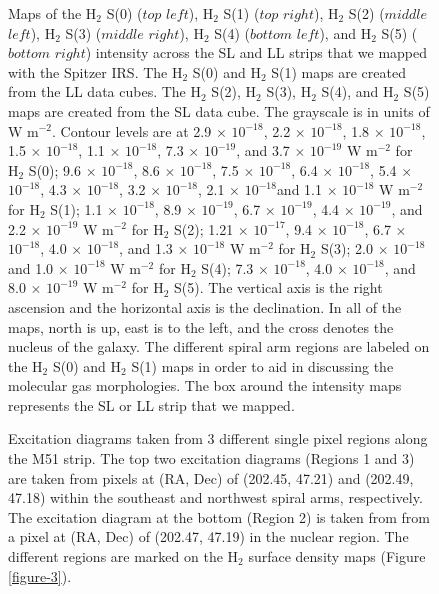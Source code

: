\documentclass[manuscript]{aastex}
\begin{document}
 \begin{figure}
 \caption{Maps of the $\mathrm{H_2}$ S(0) ($top$ $left$), $\mathrm{H_2}$ S(1)
 ($top$ $right$), $\mathrm{H_2}$ S(2) ($middle$ $left$), $\mathrm{H_2}$ S(3) 
 ($middle$ $right$), $\mathrm{H_2}$ S(4) ($bottom$ $left$), and $\mathrm{H_2}$ 
 S(5) ($bottom$ $right$) intensity across the SL and LL strips that we mapped 
 with the Spitzer IRS.  The $\mathrm{H_2}$ S(0) and $\mathrm{H_2}$ S(1) 
 maps are created from the LL data cubes.    
The $\mathrm{H_2}$ S(2), $\mathrm{H_2}$ S(3), $\mathrm{H_2}$ S(4), and 
$\mathrm{H_2}$ S(5) maps are created from the SL data cube.  
The grayscale is in units of W $\mathrm{m^{-2}}$.  Contour levels are at 2.9 
$\times$ ${10^{-18}}$, 2.2 $\times$ ${10^{-18}}$, 1.8 $\times$ ${10^{-18}}$, 
1.5 $\times$ ${10^{-18}}$, 1.1 $\times$ ${10^{-18}}$, 7.3 $\times$ ${10^{-19}}$, 
and 3.7 $\times$ ${10^{-19}}$ W $\mathrm{m^{-2}}$ for $\mathrm{H_2}$ S(0); 9.6 
$\times$ ${10^{-18}}$, 8.6 $\times$ ${10^{-18}}$, 7.5 $\times$ ${10^{-18}}$, 6.4
 $\times$ ${10^{-18}}$, 5.4 $\times$ ${10^{-18}}$, 4.3 $\times$ ${10^{-18}}$, 3.2
  $\times$ ${10^{-18}}$, 2.1 $\times$ ${10^{-18}}$and 1.1 $\times$ ${10^{-18}}$ 
  W $\mathrm{m^{-2}}$ for $\mathrm{H_2}$ S(1); 1.1 $\times$ ${10^{-18}}$, 8.9 
  $\times$ ${10^{-19}}$, 6.7 $\times$ ${10^{-19}}$, 4.4 $\times$ ${10^{-19}}$, and 
  2.2 $\times$ ${10^{-19}}$ W $\mathrm{m^{-2}}$ for $\mathrm{H_2}$ S(2); 1.21 
  $\times$ ${10^{-17}}$, 9.4 $\times$ ${10^{-18}}$, 6.7 $\times$ ${10^{-18}}$, 
  4.0 $\times$ ${10^{-18}}$, and 1.3 $\times$ ${10^{-18}}$ W $\mathrm{m^{-2}}$ 
  for $\mathrm{H_2}$ S(3);  2.0 $\times$ ${10^{-18}}$and 1.0 $\times$ ${10^{-18}}$ 
  W $\mathrm{m^{-2}}$ for $\mathrm{H_2}$ S(4); 7.3 $\times$ ${10^{-18}}$, 4.0 $\times$ 
  ${10^{-18}}$, and 8.0 $\times$ ${10^{-19}}$ W $\mathrm{m^{-2}}$ for $\mathrm{H_2}$ S(5).  
  The vertical axis is the right ascension and the horizontal axis is the declination.  
  In all of the maps, north is up, east is to the left, and the cross 
  denotes the nucleus of the galaxy.  The different spiral 
  arm regions are labeled on the $\mathrm{H_2}$ S(0) and $\mathrm{H_2}$ S(1) 
  maps in order to aid in discussing the molecular gas morphologies.  The box around 
  the intensity maps represents the SL or LL strip that we mapped.}
  \label{figure-1}
  \end{figure}

\clearpage

\begin{figure}
\caption{Excitation diagrams taken from 3 different single pixel 
regions along the M51 strip.  The top two excitation 
diagrams (Regions 1 and 3) are taken from pixels at (RA, Dec) of (202.45, 47.21) and 
(202.49, 47.18) within the southeast and northwest spiral arms, respectively. The excitation 
diagram at the bottom (Region 2) is taken from from a pixel at (RA, Dec) of (202.47, 47.19) in the 
nuclear region.  The different regions are marked on the H$_2$ surface density maps 
(Figure \ref{figure-3}).}
\label{figure-2}
\end{figure}
\end{document}
